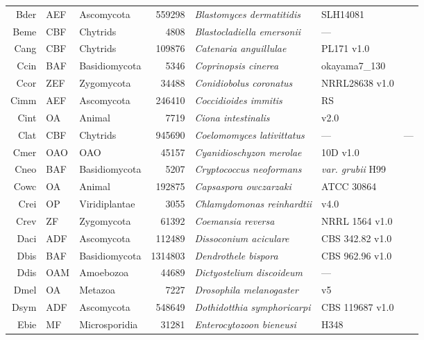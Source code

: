 {{{\begin{longtable}{rllrlll}
  Bder & AEF & Ascomycota & 559298 & \emph{Blastomyces dermatitidis} & SLH14081 & \cite{McCullough2000} \\ 
  Beme & CBF & Chytrids & 4808 & \emph{Blastocladiella emersonii} & --- & \cite{Ribichich2005} \\ 
  Cang & CBF & Chytrids & 109876 & \emph{Catenaria anguillulae} & PL171 v1.0 & \cite{Cang} \\ 
  Ccin & BAF & Basidiomycota & 5346 & \emph{Coprinopsis cinerea} & okayama7\_130 & \cite{Stajich2010Ccin} \\ 
  Ccor & ZEF & Zygomycota & 34488 & \emph{Conidiobolus coronatus} & NRRL28638 v1.0 & \cite{Chang2015} \\ 
  Cimm & AEF & Ascomycota & 246410 & \emph{Coccidioides immitis} & RS & \cite{Sharpton2009} \\ 
  Cint & OA & Animal & 7719 & \emph{Ciona intestinalis} & v2.0 & \cite{Cint} \\ 
  Clat & CBF & Chytrids & 945690 & \emph{Coelomomyces lativittatus} & --- & --- \\ 
  Cmer & OAO & OAO & 45157 & \emph{Cyanidioschyzon merolae} & 10D v1.0 & \cite{Matsuzaki2004} \\ 
  Cneo & BAF & Basidiomycota & 5207 & \emph{Cryptococcus neoformans} & \textit{var. grubii} H99 & \cite{Stajich2012FungiDB} \\ 
  Cowc & OA & Animal & 192875 & \emph{Capsaspora owczarzaki} & ATCC 30864 & \cite{RuizTrillo2007} \\ 
  Crei & OP & Viridiplantae & 3055 & \emph{Chlamydomonas reinhardtii} & v4.0 & \cite{Merchant2007} \\ 
  Crev & ZF & Zygomycota & 61392 & \emph{Coemansia reversa} & NRRL 1564 v1.0 & \cite{Chang2015} \\ 
  Daci & ADF & Ascomycota & 112489 & \emph{Dissoconium aciculare} & CBS 342.82 v1.0 & \cite{Daci} \\ 
  Dbis & BAF & Basidiomycota & 1314803 & \emph{Dendrothele bispora} & CBS 962.96 v1.0 & \cite{Dbis} \\ 
  Ddis & OAM & Amoebozoa & 44689 & \emph{Dictyostelium discoideum} & --- & \cite{Eichinger2005} \\ 
  Dmel & OA & Metazoa & 7227 & \emph{Drosophila melanogaster} & v5 & \cite{DosSantos2015} \\ 
  Dsym & ADF & Ascomycota & 548649 & \emph{Dothidotthia symphoricarpi} & CBS 119687 v1.0 & \cite{Dsym} \\ 
  Ebie & MF & Microsporidia & 31281 & \emph{Enterocytozoon bieneusi} & H348 & \cite{Corradi2007} \\ 

\end{longtable}}}}
